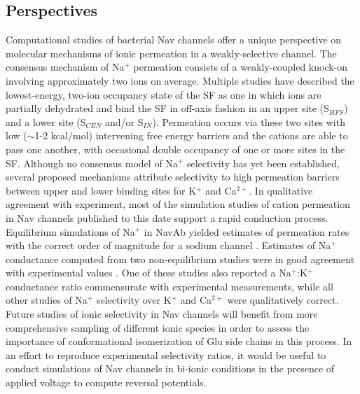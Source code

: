 \begin{refsection}
 \section{Perspectives}
 Computational studies of bacterial Nav channels offer a unique perspective on molecular mechanisms of ionic permeation in a weakly-selective channel.  The consensus mechanism of Na$^{+}$ permeation consists of a weakly-coupled knock-on involving approximately two ions on average.  Multiple studies have described the lowest-energy, two-ion occupancy state of the SF as one in which ions are partially dehydrated and bind the SF in off-axis fashion in an upper site (S$_{HFS}$) and a lower site (S$_{CEN}$ and/or S$_{IN}$).  Permeation occurs via these two sites with low ($\sim$1-2 kcal/mol) intervening free energy barriers and the cations are able to pass one another, with occasional double occupancy of one or more sites in the SF.  Although no consensus model of Na$^{+}$ selectivity has yet been established, several proposed mechanisms attribute selectivity to high permeation barriers between upper and lower binding sites for K$^{+}$ and Ca$^{2+}$.  
In qualitative agreement with experiment, most of the simulation studies of cation permeation in Nav channels published to this date support a rapid conduction process.  Equilibrium simulations of Na$^{+}$ in NavAb yielded estimates of permeation rates with the correct order of magnitude for a sodium channel \cite{Chakrabarti:2013kd}.  Estimates of Na$^{+}$ conductance computed from two non-equilibrium studies were in good agreement with experimental values \cite{Ke:2014fy,Ulmschneider:2013da}.  One of these studies also reported a Na$^{+}$:K$^{+}$ conductance ratio commensurate with experimental measurements, while all other studies of Na$^{+}$ selectivity over K$^{+}$ and Ca$^{2+}$ were qualitatively correct.  Future studies of ionic selectivity in Nav channels will benefit from more comprehensive sampling of different ionic species in order to assess the importance of conformational isomerization of Glu side chains in this process.  In an effort to reproduce experimental selectivity ratios, it would be useful to conduct simulations of Nav channels in bi-ionic conditions in the presence of applied voltage to compute reversal potentials.

\end{refsection}
